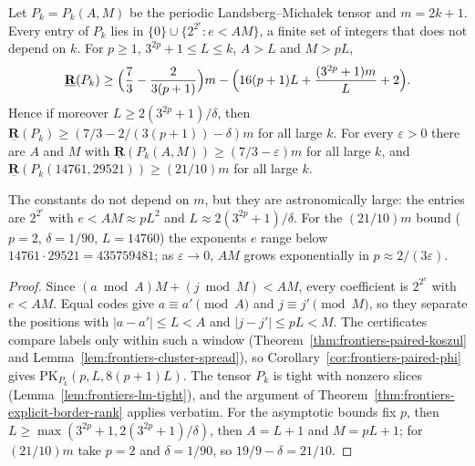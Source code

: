 \begin{theorem}
  \label{thm:frontiers-periodic-border-rank}
  \leanok
  Let $P_k = P_k(A, M)$ be the periodic Landsberg--Micha{\l}ek tensor and $m = 2k + 1$. Every
  entry of $P_k$ lies in $\{0\} \cup \{2^{2^e} : e < AM\}$, a finite set of integers that does
  not depend on $k$. For $p \ge 1$, $3^{2p} + 1 \le L \le k$, $A > L$ and $M > pL$,
  \[
    \underline{\mathbf{R}}(P_k) \ge \Bigl(\frac{7}{3} - \frac{2}{3(p + 1)}\Bigr) m
      - \Bigl(16(p + 1)L + \frac{(3^{2p} + 1)m}{L} + 2\Bigr).
  \]
  Hence if moreover $L \ge 2(3^{2p} + 1)/\delta$, then
  $\underline{\mathbf{R}}(P_k) \ge (7/3 - 2/(3(p + 1)) - \delta)m$ for all large $k$. For
  every $\varepsilon > 0$ there are $A$ and $M$ with
  $\underline{\mathbf{R}}(P_k(A, M)) \ge (7/3 - \varepsilon)m$ for all large $k$, and
  $\underline{\mathbf{R}}(P_k(14761, 29521)) \ge (21/10)m$ for all large $k$.

  The constants do not depend on $m$, but they are astronomically large: the entries are
  $2^{2^e}$ with $e < AM \approx pL^2$ and $L \approx 2(3^{2p} + 1)/\delta$. For the
  $(21/10)m$ bound ($p = 2$, $\delta = 1/90$, $L = 14760$) the exponents $e$ range below
  $14761 \cdot 29521 = 435759481$; as $\varepsilon \to 0$, $AM$ grows exponentially in
  $p \approx 2/(3\varepsilon)$.
\end{theorem}
\begin{proof}
  \leanok
  Since $(a \bmod A) M + (j \bmod M) < AM$, every coefficient is $2^{2^e}$ with $e < AM$.
  Equal codes give $a \equiv a' \pmod A$ and $j \equiv j' \pmod M$, so they separate the
  positions with $|a - a'| \le L < A$ and $|j - j'| \le pL < M$. The certificates compare
  labels only within such a window (Theorem~\ref{thm:frontiers-paired-koszul} and
  Lemma~\ref{lem:frontiers-cluster-spread}), so Corollary~\ref{cor:frontiers-paired-phi}
  gives $\mathrm{PK}_{P_k}(p, L, 8(p + 1)L)$. The tensor $P_k$ is tight with nonzero slices
  (Lemma~\ref{lem:frontiers-lm-tight}), and the argument of
  Theorem~\ref{thm:frontiers-explicit-border-rank} applies verbatim. For the asymptotic
  bounds fix $p$, then $L \ge \max(3^{2p} + 1, 2(3^{2p} + 1)/\delta)$, then $A = L + 1$ and
  $M = pL + 1$; for $(21/10)m$ take $p = 2$ and $\delta = 1/90$, so $19/9 - \delta = 21/10$.
\end{proof}

